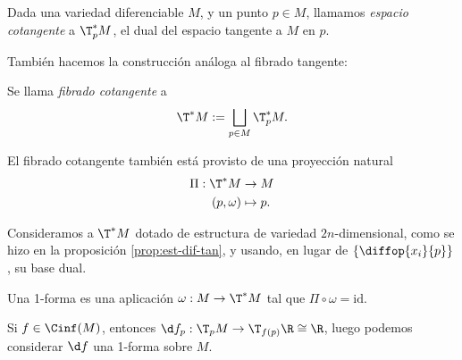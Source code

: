 \begin{ndef}
Dada una variedad diferenciable $M$, y un punto $p\in M$, llamamos \emph{espacio
cotangente} a $\T_{p}^{*}M$, el dual del espacio tangente a $M$ en $p$.
\end{ndef}

También hacemos la construcción análoga al fibrado tangente:
\begin{ndef}
  Se llama \emph{fibrado cotangente} a
  \[
    \T^{*}M := \bigsqcup_{p\in M} \T^{*}_{p}M
  .\]
\end{ndef}

El fibrado cotangente también está provisto de una proyección natural
\begin{alignat*}{2}
  \Pi: \T^{*}M & \to M \\
 (p,\omega) & \mapsto p.
\end{alignat*}

Consideramos a $\T^{*}M$ dotado de estructura de variedad $2n$-dimensional, como
se hizo en la proposición \ref{prop:est-dif-tan}, y usando, en lugar de $\left\{
  \diffop{x_{i}}{p} \right\}$, su base dual.

\begin{ndef}[1-forma]
  Una 1-forma es una aplicación $\omega: M\to \T^{*}M$ tal que $\Pi\circ\omega =
  \mathrm{id}$.
\end{ndef}

\begin{ejemplo}
  Si $f\in\Cinf(M)$, entonces $\d f_{p}: \T_{p}M \to \T_{f(p)}\R\cong \R$, luego
  podemos considerar $\d f$ una 1-forma sobre $M$.
\end{ejemplo}

